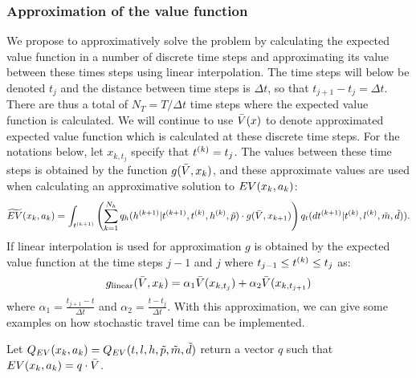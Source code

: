 \subsubsection{Approximation of the value function}
We propose to approximatively solve the problem by calculating the expected value function in a number of discrete time steps and approximating its value between these times steps using linear interpolation. The time steps will below be denoted $t_j$ and the distance between time steps is $\Delta t$, so that $t_{j+1}-t_j = \Delta t$. There are thus a total of $N_T = T/\Delta t$ time steps where the expected value function is calculated. We will continue to use $\bar{V}(x)$ to denote approximated expected value function which is calculated at these discrete time steps. For the notations below, let $x_{k,t_j}$ specify that $t^{(k)} = t_j$. The values between these time steps is obtained by the function $g(\bar{V},x_k)$, and these approximate values are used when calculating an approximative solution to $EV(x_k,a_k)$: 
\begin{equation} \label{eq:eutilapprox}
\begin{aligned}
\aeutil(x_k,a_k)= \int_{t\ks{k+1}} \left( \sum_{k=1}^{N_{\amem}}q_\amem(\amem\ks{k+1}|t\ks{k+1}, t\ks{k},\amem\ks{k},\act{p}) \cdot g(\ev,x_{k+1}) \right)q_t(dt\ks{k+1}|t\ks{k},l\ks{k},\act{m},\act{d})).
\end{aligned}
\end{equation}
If linear interpolation is used for approximation $g$ is obtained by the expected value function at the time steps $j-1$ and $j$ where $t_{j-1} \leq t^{(k)} \leq t_j $ as: 
\begin{equation}\label{eq:linap2}
g_\text{linear}(\ev,x_k) = \alpha_1 \ev(x_{k,t_j}) + \alpha_2 \ev(x_{k,t_{j+1}})
\end{equation}
where $\alpha_1 = \frac{t_{j+1}-t}{\Delta t}$ and $\alpha_2 = \frac{t-t_j}{\Delta t}$.
With this approximation, we can give some examples on how stochastic travel time can be implemented.

Let $Q_{EV}(x_k,a_k)=Q_{EV}(t,l,h,\tilde{p},\tilde{m},\tilde{d})$ return a vector $q$ such that $EV(x_k,a_k) =  q \cdot \bar{V}$. 


